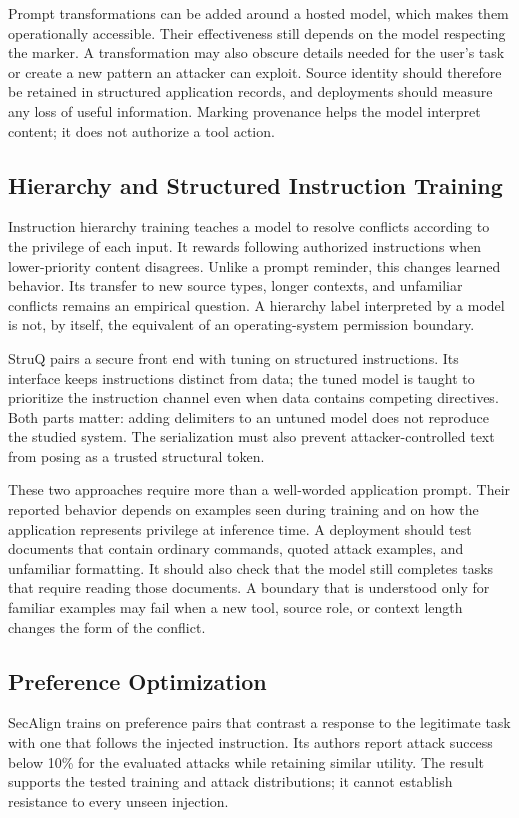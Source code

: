 \documentclass[conference]{IEEEtran}
\begin{document}
Prompt transformations can be added around a hosted model, which makes them operationally accessible. Their effectiveness still depends on the model respecting the marker. A transformation may also obscure details needed for the user's task or create a new pattern an attacker can exploit. Source identity should therefore be retained in structured application records, and deployments should measure any loss of useful information. Marking provenance helps the model interpret content; it does not authorize a tool action.

\subsection{Hierarchy and Structured Instruction Training}
Instruction hierarchy training \cite{wallace2024hierarchy} teaches a model to resolve conflicts according to the privilege of each input. It rewards following authorized instructions when lower-priority content disagrees. Unlike a prompt reminder, this changes learned behavior. Its transfer to new source types, longer contexts, and unfamiliar conflicts remains an empirical question. A hierarchy label interpreted by a model is not, by itself, the equivalent of an operating-system permission boundary.

StruQ \cite{chen2025struq} pairs a secure front end with tuning on structured instructions. Its interface keeps instructions distinct from data; the tuned model is taught to prioritize the instruction channel even when data contains competing directives. Both parts matter: adding delimiters to an untuned model does not reproduce the studied system. The serialization must also prevent attacker-controlled text from posing as a trusted structural token.

These two approaches require more than a well-worded application prompt. Their reported behavior depends on examples seen during training and on how the application represents privilege at inference time. A deployment should test documents that contain ordinary commands, quoted attack examples, and unfamiliar formatting. It should also check that the model still completes tasks that require reading those documents. A boundary that is understood only for familiar examples may fail when a new tool, source role, or context length changes the form of the conflict.

\subsection{Preference Optimization}
SecAlign \cite{chen2025secalign} trains on preference pairs that contrast a response to the legitimate task with one that follows the injected instruction. Its authors report attack success below 10\% for the evaluated attacks while retaining similar utility. The result supports the tested training and attack distributions; it cannot establish resistance to every unseen injection.
\end{document}
